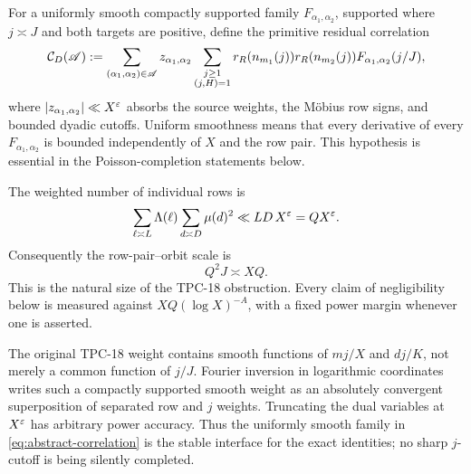 For a uniformly smooth compactly supported family
\(F_{\alpha_1,\alpha_2}\), supported where \(j\asymp J\) and both
targets are positive, define the primitive residual correlation
\begin{align}
 \mathcal C_D(\mathscr A)
 :=\sum_{(\alpha_1,\alpha_2)\in\mathscr A}
 z_{\alpha_1,\alpha_2}
 \sum_{\substack{j\ge1\\(j,H)=1}}
 r_R(n_{m_1}(j))r_R(n_{m_2}(j))
 F_{\alpha_1,\alpha_2}(j/J),
 \label{eq:abstract-correlation}
\end{align}
where \(|z_{\alpha_1,\alpha_2}|\ll X^\varepsilon\) absorbs the source weights,
the M\"obius row signs, and bounded dyadic cutoffs.  Uniform smoothness
means that every derivative of every \(F_{\alpha_1,\alpha_2}\) is
bounded independently of \(X\) and the row pair.  This hypothesis is
essential in the Poisson-completion statements below.

The weighted number of individual rows is
\begin{equation}
 \sum_{\ell\asymp L}\Lambda(\ell)
 \sum_{d\asymp D}\mu(d)^2\ll LD\,X^\varepsilon=QX^\varepsilon.
 \label{eq:row-mass}
\end{equation}
Consequently the row-pair--orbit scale is
\begin{equation}
 Q^2J\asymp XQ.
 \label{eq:natural-scale}
\end{equation}
This is the natural size of the TPC-18 obstruction.  Every claim of
negligibility below is measured against \(XQ(\log X)^{-A}\), with a
fixed power margin whenever one is asserted.

\begin{remark}
The original TPC-18 weight contains smooth functions of \(mj/X\) and
\(dj/K\), not merely a common function of \(j/J\).  Fourier inversion
in logarithmic coordinates writes such a compactly supported smooth
weight as an absolutely convergent superposition of separated row and
\(j\) weights.  Truncating the dual variables at \(X^\varepsilon\) has
arbitrary power accuracy.  Thus the uniformly smooth family in
\eqref{eq:abstract-correlation} is the stable interface for the exact
identities; no sharp \(j\)-cutoff is being silently completed.
\end{remark}
